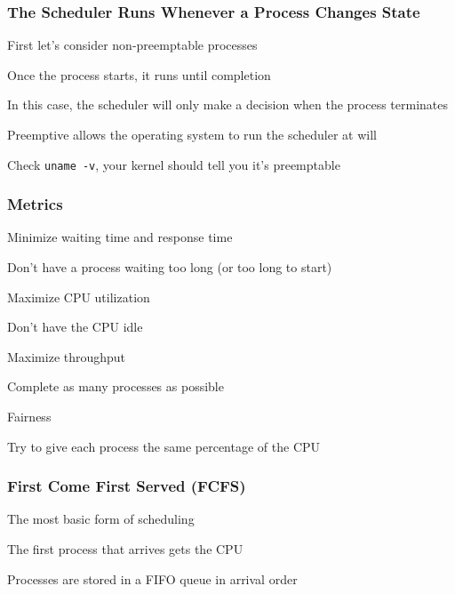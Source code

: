   \begin{frame}
    \frametitle{The Scheduler Runs Whenever a Process Changes State}

    First let's consider non-preemptable processes

    \hspace{2em} Once the process starts, it runs until completion

    \vspace{2em}

    In this case, the scheduler will only make a decision when the process
    terminates

    \vspace{4em}

    Preemptive allows the operating system to run the scheduler at will

    \hspace{2em} Check \texttt{uname -v}, your kernel should tell you it's preemptable
  \end{frame}

  \begin{frame}
    \frametitle{Metrics}

    Minimize waiting time and response time

    \hspace{2em} Don't have a process waiting too long (or too long to start)

    \vspace{2em}

    Maximize CPU utilization

    \hspace{2em} Don't have the CPU idle

    \vspace{2em}

    Maximize throughput

    \hspace{2em} Complete as many processes as possible

    \vspace{2em}

    Fairness

    \hspace{2em} Try to give each process the same percentage of the CPU
  \end{frame}

  \begin{frame}
    \frametitle{First Come First Served (FCFS)}

    The most basic form of scheduling

    \vspace{2em}

    The first process that arrives gets the CPU

    \vspace{2em}

    Processes are stored in a FIFO queue in arrival order
  \end{frame}
  
